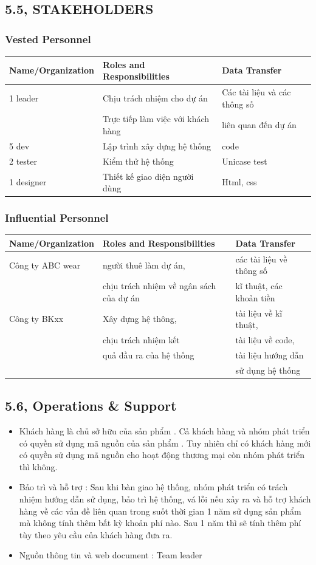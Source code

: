 \documentclass[a4paper,11pt]{report}
\begin{document}
\subsection*{5.5, STAKEHOLDERS}
\subsubsection{Vested Personnel}
\begin{longtable}{|l|l|l|}
\hline
Name/Organization & Roles and Responsibilities & Data Transfer \\
\hline
1 leader & Chịu trách nhiệm cho dự án & Các tài liệu và các thông số\\
& Trực tiếp làm việc với khách hàng  &  liên quan đến dự án \\
\hline
5 dev &  Lập trình xây dựng hệ thống & code \\
\hline
2 tester & Kiểm thử hệ thống & Unicase test \\
\hline
1 designer & Thiết kế giao diện người dùng & Html, css \\
\hline
\end{longtable}
\subsubsection{Influential Personnel}
\begin{longtable}{|l|l|l|}
\hline
Name/Organization & Roles and Responsibilities & Data Transfer \\
\hline
Công ty ABC wear & người thuê làm dự án,  & các tài liệu về thông số \\
&  chịu trách nhiệm về ngân sách của dự án &  kĩ thuật, các khoản tiền \\
\hline
Công ty BKxx & Xây dựng hệ thông, & tài liệu về kĩ thuật, \\
& chịu trách nhiệm kết & tài liệu về code, \\
& quả đầu ra của hệ thống & tài liệu hướng dẫn \\
& & sử dụng hệ thống \\
\hline
\end{longtable}
\subsection*{5.6, Operations \& Support}
\begin{itemize}
\item Khách hàng là chủ sở hữu của sản phẩm . Cả khách hàng và nhóm phát triển có quyền sử dụng mã nguồn của sản phẩm . Tuy nhiên chỉ có khách hàng mới có quyền sử dụng mã nguồn cho hoạt động thương mại còn nhóm phát triển thì không.
\item Bảo trì và hỗ trợ : Sau khi bàn giao hệ thống, nhóm phát triển có trách nhiệm hướng dẫn sử dụng, bảo trì hệ thống, vá lỗi nếu xảy ra và hỗ trợ khách hàng về các vấn đề liên quan trong suốt thời gian 1 năm sử dụng sản phẩm mà không tính thêm bất kỳ khoản phí nào. Sau 1 năm thì sẽ tính thêm phí tùy theo yêu cầu của khách hàng đưa ra. 
\item Nguồn thông tin và web document : Team leader
\end{itemize}
\end{document}
